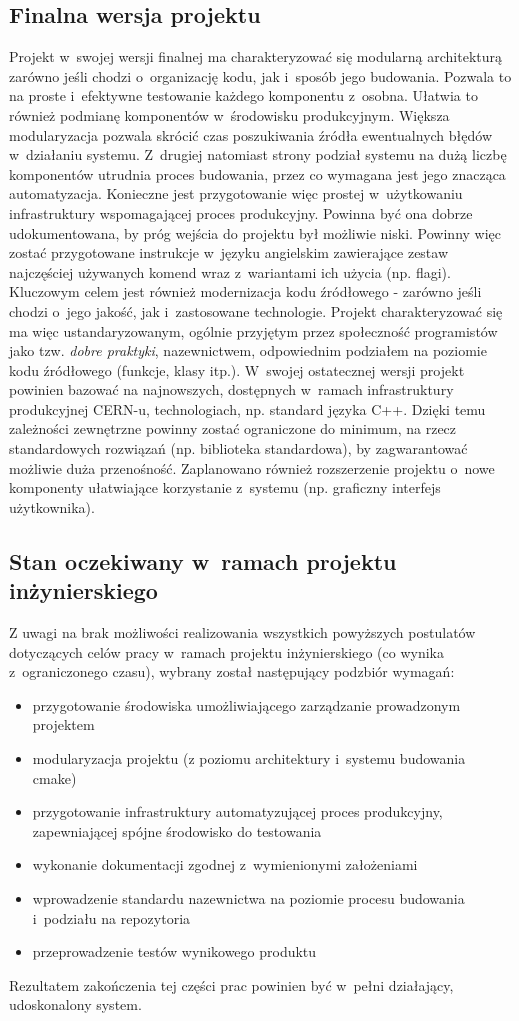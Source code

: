 \subsection{Finalna wersja projektu}
Projekt w~swojej wersji finalnej ma charakteryzować się modularną architekturą zarówno jeśli chodzi o~organizację kodu, jak i~sposób jego budowania. Pozwala to na proste i~efektywne testowanie każdego komponentu z~osobna. Ułatwia to również podmianę komponentów w~środowisku produkcyjnym. Większa modularyzacja pozwala skrócić czas poszukiwania źródła ewentualnych błędów w~działaniu systemu. Z~drugiej natomiast strony podział systemu na dużą liczbę komponentów utrudnia proces budowania, przez co wymagana jest jego znacząca automatyzacja. Konieczne jest przygotowanie więc prostej w~użytkowaniu infrastruktury wspomagającej proces produkcyjny. Powinna być ona dobrze udokumentowana, by próg wejścia do projektu był możliwie niski. Powinny więc zostać przygotowane instrukcje w~języku angielskim zawierające zestaw najczęściej używanych komend wraz z~wariantami ich użycia (np. flagi). Kluczowym celem jest również modernizacja kodu źródłowego - zarówno jeśli chodzi o~jego jakość, jak i~zastosowane technologie. Projekt charakteryzować się ma więc ustandaryzowanym, ogólnie przyjętym przez społeczność programistów jako tzw. \textit{dobre praktyki}, nazewnictwem, odpowiednim podziałem na poziomie kodu źródłowego (funkcje, klasy itp.). W~swojej ostatecznej wersji projekt powinien bazować na najnowszych, dostępnych w~ramach infrastruktury produkcyjnej CERN-u, technologiach, np. standard języka C++. Dzięki temu zależności zewnętrzne powinny zostać ograniczone do minimum, na rzecz standardowych rozwiązań (np. biblioteka standardowa), by zagwarantować możliwie duża przenośność. Zaplanowano również rozszerzenie projektu o~nowe komponenty ułatwiające korzystanie z~systemu (np. graficzny interfejs użytkownika).

\subsection{Stan oczekiwany w~ramach projektu inżynierskiego}
Z uwagi na brak możliwości realizowania wszystkich powyższych postulatów dotyczących celów pracy w~ramach projektu inżynierskiego (co wynika z~ograniczonego czasu), wybrany został następujący podzbiór wymagań:
\begin{itemize}
\item przygotowanie środowiska umożliwiającego zarządzanie prowadzonym projektem
\item modularyzacja projektu (z poziomu architektury i~systemu budowania \gls*{cmake})
\item przygotowanie infrastruktury automatyzującej proces produkcyjny, zapewniającej spójne środowisko do testowania
\item wykonanie dokumentacji zgodnej z~wymienionymi założeniami
\item wprowadzenie standardu nazewnictwa na poziomie procesu budowania i~podziału na repozytoria
\item przeprowadzenie testów wynikowego produktu
\end{itemize}
Rezultatem zakończenia tej części prac powinien być w~pełni działający, udoskonalony system.


